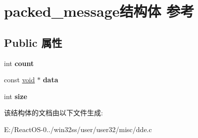\hypertarget{structpacked__message}{}\section{packed\+\_\+message结构体 参考}
\label{structpacked__message}
\subsection*{Public 属性}
\begin{DoxyCompactItemize}
\item 
\mbox{\label{structpacked__message_a9682ceacd9b4e492356498813727bf97}} 
int {\bfseries count}
\item 
\mbox{\label{structpacked__message_aed1256c5918302c4c4c2f7d4b6c2949e}} 
const \hyperlink{interfacevoid}{void} $\ast$ {\bfseries data}
\item 
\mbox{\label{structpacked__message_a8e5bd4347f4b0b00c35284974fde0156}} 
int {\bfseries size}
\end{DoxyCompactItemize}


该结构体的文档由以下文件生成\+:\begin{DoxyCompactItemize}
\item 
E\+:/\+React\+O\+S-\/0../win32ss/user/user32/misc/dde.\+c\end{DoxyCompactItemize}
